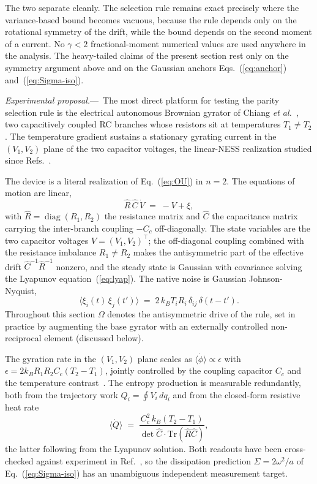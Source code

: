 \documentclass[%
 reprint,
 superscriptaddress,
 nofootinbib,
 nobibnotes,
 amsmath,amssymb,
 aps,
 prl,
 floatfix,
]{revtex4-2}
\DeclareMathOperator{\diag}{diag}
\newcommand{\plsection}[1]{\par\medskip\noindent\textit{#1.}---\,\ignorespaces}
\begin{document}
The two separate cleanly. The selection rule remains exact precisely where the variance-based bound becomes vacuous, because the rule depends only on the rotational symmetry of the drift, while the bound depends on the second moment of a current. No $\gamma < 2$ fractional-moment numerical values are used anywhere in the analysis. The heavy-tailed claims of the present section rest only on the symmetry argument above and on the Gaussian anchors Eqs.~(\ref{eq:anchor}) and~(\ref{eq:Sigma-iso}).

\plsection{Experimental proposal}%
The most direct platform for testing the parity selection rule is the electrical autonomous Brownian gyrator of Chiang \emph{et al.}~\cite{Chiang2017}, two capacitively coupled RC branches whose resistors sit at temperatures $T_1 \neq T_2$. The temperature gradient sustains a stationary gyrating current in the $(V_1, V_2)$ plane of the two capacitor voltages, the linear-NESS realization studied since Refs.~\cite{Filliger2007,Dotsenko2013}.

The device is a literal realization of Eq.~(\ref{eq:OU}) in $n = 2$. The equations of motion are linear,
\begin{equation}\label{eq:gyrator}
\hat R\,\hat C\,\dot V \;=\; -V + \xi,
\end{equation}
with $\hat R = \diag(R_1, R_2)$ the resistance matrix and $\hat C$ the capacitance matrix carrying the inter-branch coupling $-C_c$ off-diagonally. The state variables are the two capacitor voltages $V = (V_1, V_2)^\top$; the off-diagonal coupling combined with the resistance imbalance $R_1 \neq R_2$ makes the antisymmetric part of the effective drift $\hat C^{-1}\hat R^{-1}$ nonzero, and the steady state is Gaussian with covariance solving the Lyapunov equation~(\ref{eq:lyap}). The native noise is Gaussian Johnson-Nyquist,
\begin{equation*}
\langle \xi_i(t)\,\xi_j(t')\rangle \;=\; 2\,k_B T_i R_i\,\delta_{ij}\,\delta(t - t').
\end{equation*}
Throughout this section $\Omega$ denotes the antisymmetric drive of the rule, set in practice by augmenting the base gyrator with an externally controlled non-reciprocal element (discussed below).

The gyration rate in the $(V_1, V_2)$ plane scales as $\langle \dot\phi\rangle \propto \epsilon$ with $\epsilon = 2 k_B R_1 R_2 C_c (T_2 - T_1)$, jointly controlled by the coupling capacitor $C_c$ and the temperature contrast~\cite{Chiang2017}. The entropy production is measurable redundantly, both from the trajectory work $Q_i = \oint V_i\,dq_i$ and from the closed-form resistive heat rate
\begin{equation}\label{eq:gyrator-heat}
\langle \dot Q\rangle \;=\; \frac{C_c^2\,k_B(T_2 - T_1)}{\det \hat C \cdot \mathrm{Tr}(\hat R \hat C)},
\end{equation}
the latter following from the Lyapunov solution. Both readouts have been cross-checked against experiment in Ref.~\cite{Chiang2017}, so the dissipation prediction $\Sigma = 2\omega^2/a$ of Eq.~(\ref{eq:Sigma-iso}) has an unambiguous independent measurement target.
\end{document}
